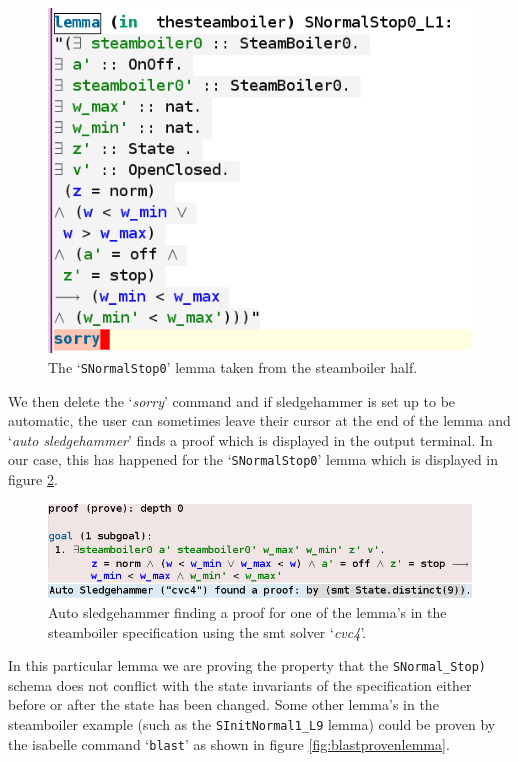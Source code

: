 \begin{figure}[H]
\centering
\includegraphics[scale=0.5]{Figures/Evaluation/sorryoutputlemma.png}
\caption{The `\texttt{SNormalStop0}' lemma taken from the steamboiler \gls{half}. \label{fig:steamboilerL1lemma}}
\end{figure}

We then delete the `\emph{sorry}' command and if sledgehammer is set up to be
automatic, the user can sometimes leave their cursor at the end of the lemma and
`\emph{auto sledgehammer}' finds a proof which is displayed in the output
terminal. In our case, this has happened for the `\texttt{SNormalStop0}' lemma
which is displayed in figure \ref{fig:autosolvelemma}.

\begin{figure}[H]
\centering
\includegraphics[scale=0.5]{Figures/Evaluation/steamboilerlemmaproof.png}
\caption{Auto sledgehammer finding a proof for one of the lemma's in the steamboiler specification using the \gls{smt} solver `\emph{cvc4}'. \label{fig:autosolvelemma}}
\end{figure}

In this particular lemma we are proving the property that the
\verb|SNormal_Stop)| schema does not conflict with the state invariants of the
specification either before or after the state has been changed. Some other
lemma's in the steamboiler example (such as the \verb|SInitNormal1_L9| lemma)
could be proven by the isabelle command `\texttt{blast}' as shown in figure
\ref{fig:blastprovenlemma}. 

